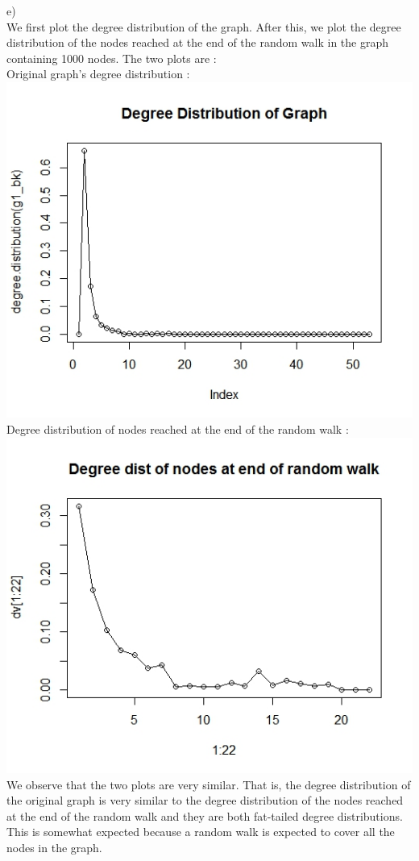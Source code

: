 \documentclass{article}
\begin{document}
e)\\
We first plot the degree distribution of the graph.
After this, we plot the degree distribution of the nodes reached at the end of the random walk 
in the graph containing 1000 nodes. The two plots are :\\
Original graph's degree distribution :\\
\includegraphics[scale=0.4]{p2g} \\
Degree distribution of nodes reached at the end of the random walk :\\
\includegraphics[scale=0.4]{p2h} \\
We observe that the two plots are very similar. That is, the degree distribution of the 
original graph is very similar to the degree distribution of the nodes reached at the end of the 
random walk and they are both fat-tailed degree distributions. This is somewhat 
expected because a random walk is expected to cover all the nodes in the graph.\\
\end{document}

